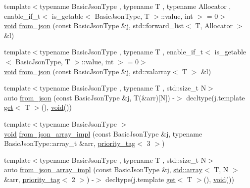 \begin{DoxyCompactItemize}
\item 
{\footnotesize template$<$typename Basic\+Json\+Type , typename T , typename Allocator , enable\+\_\+if\+\_\+t$<$ is\+\_\+getable$<$ Basic\+Json\+Type, T $>$\+::value, int $>$  = 0$>$ }\\\hyperlink{namespacenlohmann_1_1detail_a59fca69799f6b9e366710cb9043aa77d}{void} \hyperlink{namespacenlohmann_1_1detail_a5cfb765aad92795abd7fda29d017272a}{from\+\_\+json} (const Basic\+Json\+Type \&j, std\+::forward\+\_\+list$<$ T, Allocator $>$ \&l)
\item 
{\footnotesize template$<$typename Basic\+Json\+Type , typename T , enable\+\_\+if\+\_\+t$<$ is\+\_\+getable$<$ Basic\+Json\+Type, T $>$\+::value, int $>$  = 0$>$ }\\\hyperlink{namespacenlohmann_1_1detail_a59fca69799f6b9e366710cb9043aa77d}{void} \hyperlink{namespacenlohmann_1_1detail_a3df497b1d3977f071b488ecac1401517}{from\+\_\+json} (const Basic\+Json\+Type \&j, std\+::valarray$<$ T $>$ \&l)
\item 
{\footnotesize template$<$typename Basic\+Json\+Type , typename T , std\+::size\+\_\+t N$>$ }\\auto \hyperlink{namespacenlohmann_1_1detail_a7deb2db8eed6f1762373dde7a6595760}{from\+\_\+json} (const Basic\+Json\+Type \&j, T(\&arr)\mbox{[}N\mbox{]}) -\/$>$ decltype(j.\+template \hyperlink{namespacenlohmann_1_1detail_acc422c11342b31368f610b6f96fcedc6}{get}$<$ T $>$(), \hyperlink{namespacenlohmann_1_1detail_a59fca69799f6b9e366710cb9043aa77d}{void}())
\item 
{\footnotesize template$<$typename Basic\+Json\+Type $>$ }\\\hyperlink{namespacenlohmann_1_1detail_a59fca69799f6b9e366710cb9043aa77d}{void} \hyperlink{namespacenlohmann_1_1detail_a40f7bb070a60e8ba14fffb9c117fcbd8}{from\+\_\+json\+\_\+array\+\_\+impl} (const Basic\+Json\+Type \&j, typename Basic\+Json\+Type\+::array\+\_\+t \&arr, \hyperlink{structnlohmann_1_1detail_1_1priority__tag}{priority\+\_\+tag}$<$ 3 $>$)
\item 
{\footnotesize template$<$typename Basic\+Json\+Type , typename T , std\+::size\+\_\+t N$>$ }\\auto \hyperlink{namespacenlohmann_1_1detail_aba0ce45ebb69fd2c7132a00f9a56b503}{from\+\_\+json\+\_\+array\+\_\+impl} (const Basic\+Json\+Type \&j, \hyperlink{namespacenlohmann_1_1detail_a1ed8fc6239da25abcaf681d30ace4985af1f713c9e000f5d3f280adbd124df4f5}{std\+::array}$<$ T, N $>$ \&arr, \hyperlink{structnlohmann_1_1detail_1_1priority__tag}{priority\+\_\+tag}$<$ 2 $>$) -\/$>$ decltype(j.\+template \hyperlink{namespacenlohmann_1_1detail_acc422c11342b31368f610b6f96fcedc6}{get}$<$ T $>$(), \hyperlink{namespacenlohmann_1_1detail_a59fca69799f6b9e366710cb9043aa77d}{void}())

\end{DoxyCompactItemize}
